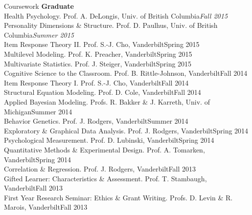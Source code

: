 \documentclass {resume}
\begin{document}
\begin{rSection}{\textrm{Coursework}}
{\large \textbf{Graduate}}\\
Health Psychology.  Prof. A. DeLongis, Univ. of British Columbia\hfill  {\textit{Fall 2015}}\smallskip\\
Personality Dimensions \& Structure.  Prof. D. Paulhus, Univ. of British Columbia\hfill  {\textit{Summer 2015}}\smallskip\\
Item Response Theory \textrm{II}. Prof. S.-J. Cho, Vanderbilt\hfill  {Spring 2015}\smallskip\\
Multilevel Modeling. Prof. K. Preacher, Vanderbilt\hfill  {Spring 2015}\smallskip\\
Multivariate Statistics. Prof. J. Steiger, Vanderbilt\hfill  {Spring 2015}\smallskip\\
Cognitive Science to the Classroom. Prof. B. Rittle-Johnson, Vanderbilt\hfill  {Fall 2014}\smallskip\\
Item Response Theory \textrm{I}. Prof. S.-J. Cho, Vanderbilt\hfill  {Fall 2014}\smallskip\\
Structural Equation Modeling. Prof. D. Cole, Vanderbilt\hfill  {Fall 2014}\smallskip\\%
Applied Bayesian Modeling. Profs. R. Bakker \& J. Karreth, Univ. of Michigan\hfill  {Summer 2014}\smallskip\\
Behavior Genetics. Prof. J. Rodgers, Vanderbilt\hfill  {Summer 2014}\smallskip\\
Exploratory \& Graphical Data Analysis. Prof. J. Rodgers, Vanderbilt\hfill  {Spring 2014}\smallskip\\
Psychological Measurement. Prof. D. Lubinski, Vanderbilt\hfill  {Spring 2014}\smallskip\\
Quantitative Methods \& Experimental Design. Prof. A. Tomarken, Vanderbilt\hfill  {Spring 2014}\smallskip\\
Correlation \& Regression. Prof. J. Rodgers, Vanderbilt\hfill  {Fall 2013}\smallskip\\
Gifted Learner: Characteristics \& Assessment. Prof. T. Stambaugh, Vanderbilt\hfill  {Fall 2013}\smallskip\\
First Year Research Seminar: Ethics \& Grant Writing. Profs. D. Levin \& R. Marois, Vanderbilt\hfill  {Fall 2013}\smallskip\\

\end{rSection}
\end{document}
